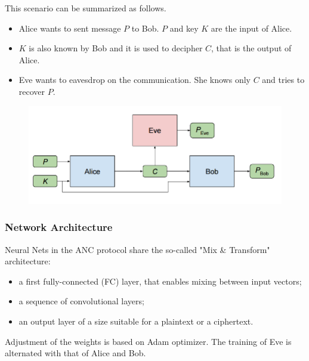 \documentclass{beamer}
\begin{document}
\begin{frame}
This scenario can be summarized as follows.
\begin{itemize}
\item Alice wants to sent message $P$ to Bob. $P$ and key $K$ are the input of Alice. 
\item $K$ is also known by Bob and it is used to decipher $C$, that is the output of Alice.
\item Eve wants to eavesdrop on the communication. She knows only $C$ and tries to recover $P$.
\end{itemize}
\begin{figure}
\includegraphics[width = \textwidth]{"pictures/anc.png"}
\end{figure}
\end{frame}
\begin{frame}
\frametitle{Network Architecture}
Neural Nets in the ANC protocol share the so-called "Mix \& Transform" architecture:
\begin{itemize}
\item a first fully-connected (FC) layer, that enables mixing between input vectors;
\item a sequence of convolutional layers;
\item an output layer of a size suitable for a plaintext or a ciphertext.
\end{itemize}
Adjustment of the weights is based on Adam optimizer. The training of Eve is alternated with that of Alice and Bob.
\end{frame}
\end{document}

